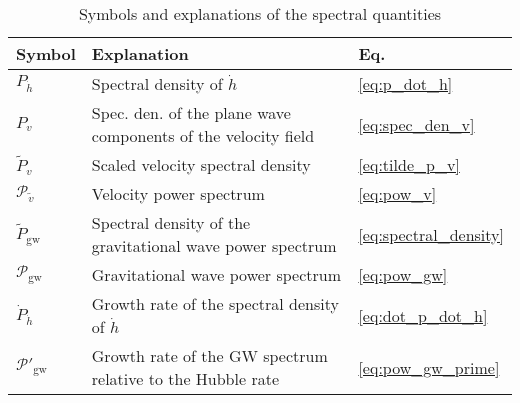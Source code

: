 \begin{table}[ht]
\caption{Symbols and explanations of the spectral quantities}
\begin{tabular}{l|l|l}
Symbol & Explanation & Eq.\\
\hline
$P_{\dot{h}}$ & Spectral density of $\dot{h}$ & \eqref{eq:p_dot_h} \\
$P_v$ & Spec. den. of the plane wave components of the velocity field & \eqref{eq:spec_den_v} \\
$\tilde{P}_v$ & Scaled velocity spectral density & \eqref{eq:tilde_p_v} \\
$\mathcal{P}_{\tilde{v}}$ & Velocity power spectrum & \eqref{eq:pow_v} \\
$\tilde{P}_\text{gw}$ & Spectral density of the gravitational wave power spectrum & \eqref{eq:spectral_density} \\
$\mathcal{P}_\text{gw}$ & Gravitational wave power spectrum & \eqref{eq:pow_gw} \\
$\dot{P}_{\dot{h}}$ & Growth rate of the spectral density of $\dot{h}$ & \eqref{eq:dot_p_dot_h} \\
$\mathcal{P}'_{\text{gw}}$ & Growth rate of the GW spectrum relative to the Hubble rate & \eqref{eq:pow_gw_prime}
\end{tabular}
\label{table:symbols}
\end{table}

